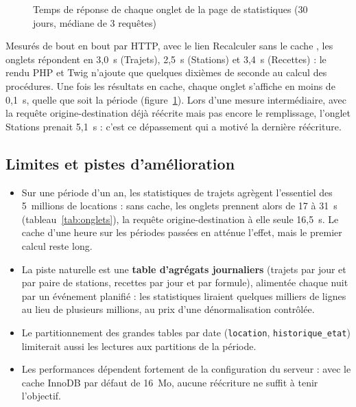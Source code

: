 \begin{figure}[htbp]\centering
{}
\caption{Temps de réponse de chaque onglet de la page de statistiques (30 jours, médiane de 3 requêtes)}\label{fig:http}
\end{figure}

Mesurés de bout en bout par HTTP, avec le lien \og Recalculer sans le cache \fg{}, les onglets répondent en 3,0~s (Trajets), 2,5~s (Stations) et 3,4~s (Recettes) : le rendu PHP et Twig n'ajoute que quelques dixièmes de seconde au calcul des procédures. Une fois les résultats en cache, chaque onglet s'affiche en moins de 0,1~s, quelle que soit la période (figure~\ref{fig:http}). Lors d'une mesure intermédiaire, avec la requête origine-destination déjà réécrite mais pas encore le remplissage, l'onglet Stations prenait 5,1~s : c'est ce dépassement qui a motivé la dernière réécriture.

\subsection{Limites et pistes d'amélioration}

\begin{itemize}
	\item Sur une période d'un an, les statistiques de trajets agrègent l'essentiel des 5~millions de locations : sans cache, les onglets prennent alors de 17 à 31~s (tableau~\ref{tab:onglets}), la requête origine-destination à elle seule 16,5~s. Le cache d'une heure sur les périodes passées en atténue l'effet, mais le premier calcul reste long.
	\item La piste naturelle est une \textbf{table d'agrégats journaliers} (trajets par jour et par paire de stations, recettes par jour et par formule), alimentée chaque nuit par un événement planifié : les statistiques liraient quelques milliers de lignes au lieu de plusieurs millions, au prix d'une dénormalisation contrôlée.
	\item Le partitionnement des grandes tables par date (\texttt{location}, \texttt{historique\_etat}) limiterait aussi les lectures aux partitions de la période.
	\item Les performances dépendent fortement de la configuration du serveur : avec le cache InnoDB par défaut de 16~Mo, aucune réécriture ne suffit à tenir l'objectif.
\end{itemize}
